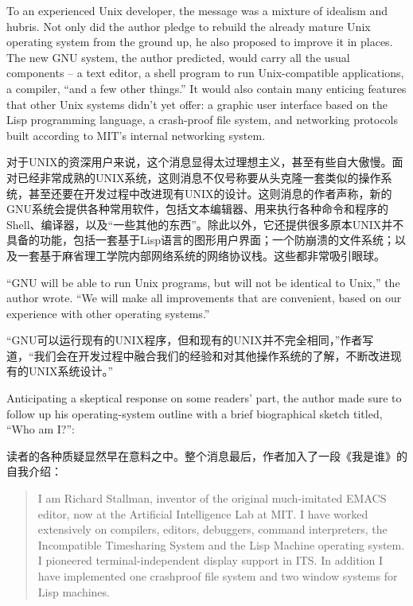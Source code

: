\ifdefined\eng
To an experienced Unix developer, the message was a mixture of idealism and hubris. Not only did the author pledge to rebuild the already mature Unix operating system from the ground up, he also proposed to improve it in places. The new GNU system, the author predicted, would carry all the usual components -- a text editor, a shell program to run Unix-compatible applications, a compiler, ``and a few other things.'' It would also contain many enticing features that other Unix systems didn't yet offer: a graphic user interface based on the Lisp programming language, a crash-proof file system, and networking protocols built according to MIT's internal networking system.
\fi

\ifdefined\chs
对于UNIX的资深用户来说，这个消息显得太过理想主义，甚至有些自大傲慢。面对已经非常成熟的UNIX系统，这则消息不仅号称要从头克隆一套类似的操作系统，甚至还要在开发过程中改进现有UNIX的设计。这则消息的作者声称，新的GNU系统会提供各种常用软件，包括文本编辑器、用来执行各种命令和程序的Shell、编译器，以及``一些其他的东西''。除此以外，它还提供很多原本UNIX并不具备的功能，包括一套基于Lisp语言的图形用户界面；一个防崩溃的文件系统；以及一套基于麻省理工学院内部网络系统的网络协议栈。这些都非常吸引眼球。
\fi

\ifdefined\eng
``GNU will be able to run Unix programs, but will not be identical to Unix,'' the author wrote. ``We will make all improvements that are convenient, based on our experience with other operating systems.''
\fi

\ifdefined\chs
``GNU可以运行现有的UNIX程序，但和现有的UNIX并不完全相同，''作者写道，``我们会在开发过程中融合我们的经验和对其他操作系统的了解，不断改进现有的UNIX系统设计。''
\fi

\ifdefined\eng
Anticipating a skeptical response on some readers' part, the author made sure to follow up his operating-system outline with a brief biographical sketch titled, ``Who am I?'':
\fi

\ifdefined\chs
读者的各种质疑显然早在意料之中。整个消息最后，作者加入了一段《我是谁》的自我介绍：
\fi

\ifdefined\eng
\begin{quote}
I am Richard Stallman, inventor of the original much-imitated EMACS editor, now at the Artificial Intelligence Lab at MIT. I have worked extensively on compilers, editors, debuggers, command interpreters, the Incompatible Timesharing System and the Lisp Machine operating system. I pioneered terminal-independent display support in ITS. In addition I have implemented one crashproof file system and two window systems for Lisp machines.
\end{quote}
\fi

